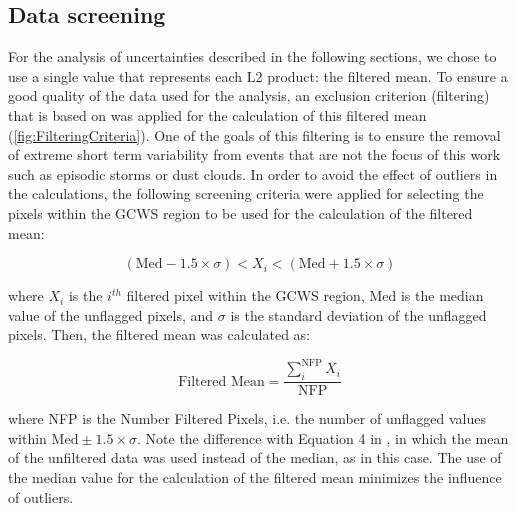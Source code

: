 \documentclass[remotesensing,article,submit,moreauthors,pdftex,10pt,a4paper]{Definitions/mdpi}
\begin{document}
\subsection{Data screening}
For the analysis of uncertainties described in the following sections, we chose to use a single value that represents each L2 product: the filtered mean. To ensure a good quality of the data used for the analysis, an exclusion criterion (filtering) that is based on \cite{Bailey2006} was applied for the calculation of this filtered mean (\autoref{fig:FilteringCriteria}). One of the goals of this filtering is to ensure the removal of extreme short term variability from events that are not the focus of this work such as episodic storms or dust clouds. In order to avoid the effect of outliers in the calculations, the following screening criteria were applied for selecting the pixels within the GCWS region to be used for the calculation of the filtered mean: 
\begin{linenomath*}
\begin{equation}\label{eq:filtered_value}
  (\text{Med}-1.5\times\sigma) <  X_i < (\text{Med}+1.5\times\sigma)
\end{equation}
\end{linenomath*}
where $X_i$ is the $i^{th}$ filtered pixel within the GCWS region, $\text{Med}$ is the median value of the unflagged pixels, and $\sigma$ is the standard deviation of the unflagged pixels. Then, the filtered mean was calculated as: 
\begin{linenomath*}
\begin{equation}\label{eq:filtered_mean}
  \text{Filtered Mean} =\frac{\displaystyle \sum_i^\text{NFP} X_i}{\text{NFP}}
\end{equation}
\end{linenomath*}
where NFP is the Number Filtered Pixels, i.e. the number of unflagged values within $\text{Med}\pm 1.5\times\sigma$. Note the difference with Equation 4 in \cite{Bailey2006}, in which the mean of the unfiltered data was used instead of the median, as in this case. The use of the median value for the calculation of the filtered mean minimizes the influence of outliers.
\end{document}
